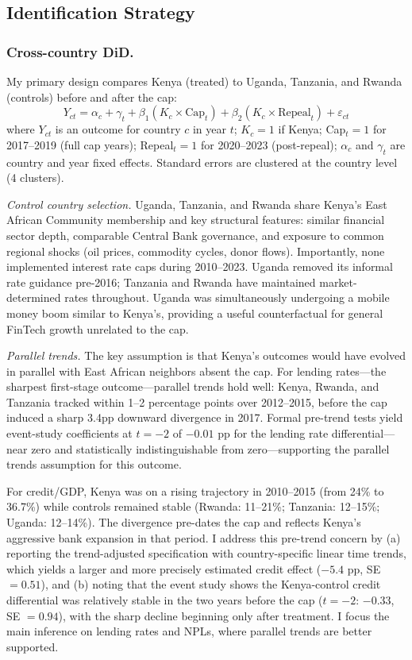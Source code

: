 \documentclass[12pt]{article}
\begin{document}
\subsection{Identification Strategy}

\subsubsection*{Cross-country DiD.}
My primary design compares Kenya (treated) to Uganda, Tanzania, and Rwanda (controls) before and after the cap:
\begin{equation}
Y_{ct} = \alpha_c + \gamma_t + \beta_1 (K_c \times \text{Cap}_t) + \beta_2 (K_c \times \text{Repeal}_t) + \varepsilon_{ct}
\end{equation}
where $Y_{ct}$ is an outcome for country $c$ in year $t$; $K_c = 1$ if Kenya; Cap$_t = 1$ for 2017--2019 (full cap years); Repeal$_t = 1$ for 2020--2023 (post-repeal); $\alpha_c$ and $\gamma_t$ are country and year fixed effects. Standard errors are clustered at the country level (4 clusters).

\textit{Control country selection.} Uganda, Tanzania, and Rwanda share Kenya's East African Community membership and key structural features: similar financial sector depth, comparable Central Bank governance, and exposure to common regional shocks (oil prices, commodity cycles, donor flows). Importantly, none implemented interest rate caps during 2010--2023. Uganda removed its informal rate guidance pre-2016; Tanzania and Rwanda have maintained market-determined rates throughout. Uganda was simultaneously undergoing a mobile money boom similar to Kenya's, providing a useful counterfactual for general FinTech growth unrelated to the cap.

\textit{Parallel trends.} The key assumption is that Kenya's outcomes would have evolved in parallel with East African neighbors absent the cap. For lending rates---the sharpest first-stage outcome---parallel trends hold well: Kenya, Rwanda, and Tanzania tracked within 1--2 percentage points over 2012--2015, before the cap induced a sharp 3.4pp downward divergence in 2017. Formal pre-trend tests yield event-study coefficients at $t=-2$ of $-0.01$ pp for the lending rate differential---near zero and statistically indistinguishable from zero---supporting the parallel trends assumption for this outcome.

For credit/GDP, Kenya was on a rising trajectory in 2010--2015 (from 24\% to 36.7\%) while controls remained stable (Rwanda: 11--21\%; Tanzania: 12--15\%; Uganda: 12--14\%). The divergence pre-dates the cap and reflects Kenya's aggressive bank expansion in that period. I address this pre-trend concern by (a) reporting the trend-adjusted specification with country-specific linear time trends, which yields a larger and more precisely estimated credit effect ($-5.4$ pp, SE $= 0.51$), and (b) noting that the event study shows the Kenya-control credit differential was relatively stable in the two years before the cap ($t=-2$: $-0.33$, SE $= 0.94$), with the sharp decline beginning only after treatment. I focus the main inference on lending rates and NPLs, where parallel trends are better supported.
\end{document}
